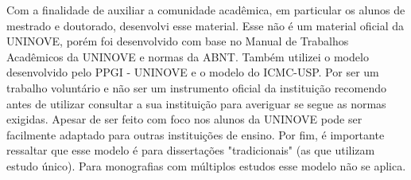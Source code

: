 

\begin{resumo}

Com a finalidade de auxiliar a comunidade acadêmica, em particular os alunos de mestrado e doutorado, desenvolvi esse material.
Esse não é um material oficial da UNINOVE, porém foi desenvolvido com base no Manual de Trabalhos Acadêmicos da UNINOVE e normas da ABNT. Também utilizei o modelo desenvolvido pelo PPGI - UNINOVE e o modelo do ICMC-USP.
Por ser um trabalho voluntário e não ser um instrumento oficial da instituição recomendo antes de utilizar consultar a sua instituição para averiguar se segue as normas exigidas.
Apesar de ser feito com foco nos alunos da UNINOVE pode ser facilmente adaptado para outras instituições de ensino.
Por fim, é importante ressaltar que esse modelo é para dissertações "tradicionais" (as que utilizam estudo único). Para monografias com múltiplos estudos esse modelo não se aplica.

\end{resumo}